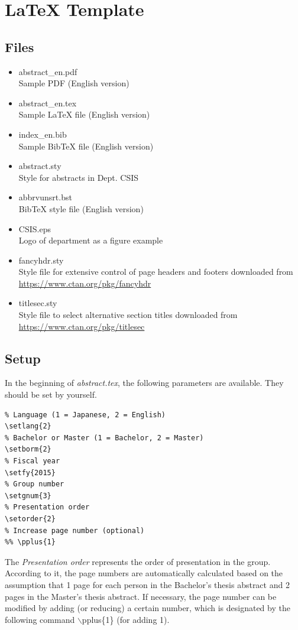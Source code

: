 \documentclass[a4paper,twoside,twocolumn,10pt]{article}
\begin{document}
\section{LaTeX Template}
\subsection{Files}
\begin{itemize}
\item abstract\_en.pdf\\
  Sample PDF (English version)
\item abstract\_en.tex\\
  Sample LaTeX file (English version)
\item index\_en.bib\\
  Sample BibTeX file (English version)
\item abstract.sty\\
  Style for abstracts in Dept. CSIS
\item abbrvunsrt.bst\\
  BibTeX style file (English version)
\item CSIS.eps\\
  Logo of department as a figure example
\item fancyhdr.sty\\
  Style file for extensive control of page headers and footers
  downloaded from \url{https://www.ctan.org/pkg/fancyhdr}
\item titlesec.sty\\
  Style file to select alternative section titles
  downloaded from \url{https://www.ctan.org/pkg/titlesec}
\end{itemize}

\subsection{Setup}
In the beginning of \textit{abstract.tex},
the following parameters are available.
They should be set by yourself.
%
\begin{verbatim}
% Language (1 = Japanese, 2 = English)
\setlang{2}
% Bachelor or Master (1 = Bachelor, 2 = Master)
\setborm{2}
% Fiscal year
\setfy{2015}
% Group number
\setgnum{3}
% Presentation order
\setorder{2}
% Increase page number (optional)
%% \pplus{1}
\end{verbatim}
%
The \textit{Presentation order} represents the order of presentation in the group.
According to it, the page numbers are automatically calculated based on
the assumption that 1 page for each person in the Bachelor's thesis
abstract and 2 pages in the Master's thesis abstract.
If necessary, the page number can be modified by adding (or reducing)
a certain number, which is designated by the following command
$\backslash$pplus\{1\} (for adding 1).
\end{document}
